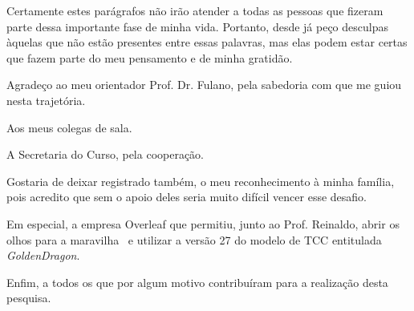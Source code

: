 
\begin{agradecimentos}
    Certamente estes parágrafos não irão atender a todas as pessoas que fizeram parte dessa importante fase de minha vida. Portanto, desde já peço desculpas àquelas que não estão presentes entre essas palavras, mas elas podem estar certas que fazem parte do meu pensamento e de minha gratidão. 
    
    Agradeço ao meu orientador Prof. Dr. Fulano, pela sabedoria com que me guiou nesta trajetória.
    
    Aos meus colegas de sala.
    
    A Secretaria do Curso, pela cooperação.
    
    Gostaria de deixar registrado também, o meu reconhecimento à minha família, pois acredito que sem o apoio deles seria muito difícil vencer esse desafio. 
    
    Em especial, a empresa Overleaf que permitiu, junto ao Prof. Reinaldo, abrir os olhos para a maravilha \LaTeXe\  e utilizar a versão 27 do modelo de TCC entitulada \textit{GoldenDragon}. 
    
    Enfim, a todos os que por algum motivo contribuíram para a realização desta pesquisa.
    \end{agradecimentos} 